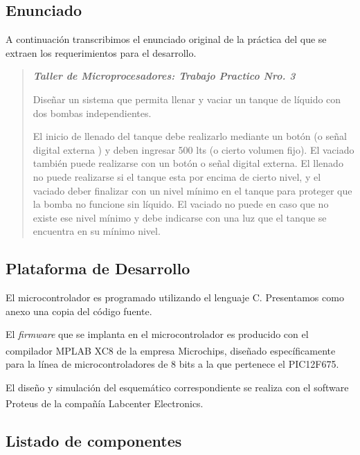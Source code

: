 ﻿\documentclass[a4paper]{article}
\let\originalcite\cite
\renewcommand{\cite}[2][]{\textsuperscript{\originalcite{#2}}}
\begin{document}
\subsection{Enunciado}

A continuación transcribimos el enunciado original de la práctica del
que se extraen los requerimientos para el desarrollo.

\begin{quotation}

    \begin{center}
        \textit{\textbf{Taller de Microprocesadores: Trabajo 
        Practico Nro. 3}}
    \end{center}

    Diseñar un sistema que permita llenar y vaciar un tanque de líquido 
    con dos bombas independientes. 

    El inicio de llenado del tanque debe realizarlo mediante un botón 
    (o señal digital externa ) y deben ingresar 500 lts (o cierto volumen 
    fijo). El vaciado también puede realizarse con un botón o señal 
    digital externa. El llenado no puede realizarse si el tanque esta por 
    encima de cierto nivel, y el vaciado deber finalizar con un nivel 
    mínimo en el tanque para proteger que la bomba no funcione sin 
    líquido. El vaciado no puede en caso que no existe ese nivel mínimo y 
    debe indicarse con una luz que el tanque se encuentra en su mínimo 
    nivel.

\end{quotation}

\subsection{Plataforma de Desarrollo}

El microcontrolador es programado utilizando el lenguaje C. 
Presentamos como anexo una copia del código fuente.

El \textit{firmware} que se implanta en el microcontrolador es  
producido con el compilador MPLAB XC8\cite{bib:compilador} de la 
empresa Microchips, diseñado específicamente para la línea de 
microcontroladores de 8 bits a la que pertenece el PIC12F675.

El diseño y simulación del esquemático correspondiente se realiza 
con el software Proteus\cite{bib:simulador} de la compañía 
Labcenter Electronics.

\subsection{Listado de componentes}
\end{document}
